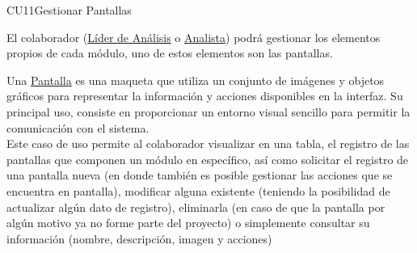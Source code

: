 	\begin{UseCase}{CU11}{Gestionar Pantallas}{
			
	El colaborador (\hyperlink{jefe}{Líder de Análisis} o \hyperlink{analista}{Analista}) podrá gestionar los elementos propios de cada módulo, uno de estos elementos son las pantallas.
	
	Una \hyperlink{pantalla}{Pantalla} es una maqueta que utiliza un conjunto de imágenes y objetos gráficos para representar la información y acciones disponibles en la interfaz. Su principal uso, consiste en proporcionar un entorno visual sencillo para permitir la comunicación con el sistema.\\
	
	Este caso de uso permite al colaborador visualizar en una tabla, el registro de las pantallas que componen un módulo en específico, así como solicitar el registro de una pantalla nueva  (en donde también es posible gestionar las acciones que se encuentra en pantalla), modificar alguna existente (teniendo la posibilidad de actualizar algún dato de registro), eliminarla (en caso de que la pantalla por algún motivo ya no forme parte del proyecto) o simplemente consultar su información (nombre, descripción, imagen y acciones) \\
	
	}
\end{UseCase}
